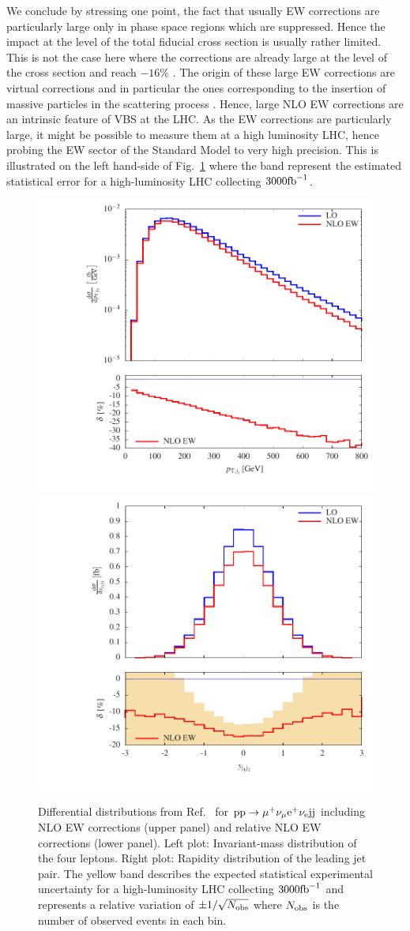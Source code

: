 We conclude by stressing one point, the fact that usually EW corrections are particularly large only in phase space regions which are suppressed.
Hence the impact at the level of the total fiducial cross section is usually rather limited.
This is not the case here where the corrections are already large at the level of the cross section and reach $-16\%$ \cite{Biedermann:2016yds}.
The origin of these large EW corrections are virtual corrections and in particular the ones corresponding to the insertion of massive particles in the scattering process \cite{Biedermann:2016yds}.
Hence, large NLO EW corrections are an intrinsic feature of VBS at the LHC.
As the EW corrections are particularly large, it might be possible to measure them at a high luminosity LHC, hence probing the EW sector of the Standard Model to very high precision.
This is illustrated on the left hand-side of Fig.~\ref{fig:VBSEW} where the band represent the estimated statistical error for a high-luminosity LHC collecting $3000{\rm fb}^{-1}$.

\begin{figure}
\includegraphics[width=.47\textwidth]{WG1_plots/histogram_transverse_momentum_j1_ew}
\includegraphics[width=.47\textwidth]{WG1_plots/histogram_rapidity_j1j2_ew}
\caption{Differential distributions from Ref.~\cite{Biedermann:2016yds} for ${\rm p}{\rm p}\to\mu^+\nu_\mu{\rm e}^+\nu_{\rm e}{\rm j}{\rm j}$ including NLO EW corrections (upper panel) and relative NLO EW corrections (lower panel).
Left plot: Invariant-mass distribution of the four leptons.
Right plot: Rapidity distribution of the leading jet pair.
The yellow band describes the expected statistical experimental uncertainty for a high-luminosity LHC collecting $3000{\rm fb}^{-1}$ and represents a relative variation of $\pm 1/\sqrt{N_{\rm obs}}$ where $N_{\rm obs}$ is the number of observed events in each bin.}
\label{fig:VBSEW}
\end{figure}

